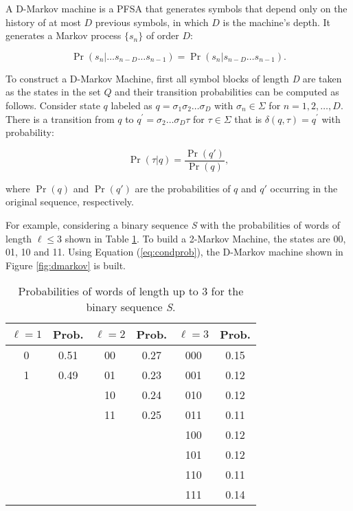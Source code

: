 {A D-Markov machine is a PFSA that generates symbols that depend only on the history of at most $D$ previous symbols, in which $D$ is the machine's depth. It generates a Markov process $\{s_n\}$ of order $D$:

\[
\Pr(s_n|\ldots s_{n-D}\ldots s_{n-1}) = \Pr(s_n|s_{n-D}\ldots s_{n-1}).
\]

\noindent To construct a D-Markov Machine, first all symbol blocks of length \textit{D} are taken as the states in the set $Q$ and their transition probabilities can be computed as follows. Consider state $q$ labeled as $q = \sigma_1\sigma_2\ldots\sigma_{D}$ with $\sigma_n\in\Sigma$ for $n = 1,2,\ldots,D$. There is a transition from $q$ to $q^{\prime} = \sigma_2\ldots\sigma_{D}\tau$ for $\tau\in\Sigma$ that is $\delta(q,\tau) = q^{\prime}$ with probability:

\begin{equation}\label{eq:condprob}
\Pr(\tau | q) = \frac{\Pr(q')}{\Pr(q)},
\end{equation}

\noindent where $\Pr(q)$ and $\Pr(q')$ are the probabilities of $q$ and $q'$ occurring in the original sequence, respectively.

For example, considering a binary sequence \textit{S} with the probabilities of words of length $\ell \leq 3$ shown in Table \ref{tab:subseq}. To build a 2-Markov Machine, the states are 00, 01, 10 and 11.  Using Equation (\ref{eq:condprob}), the D-Markov machine shown in Figure \ref{fig:dmarkov} is built.

\begin{table}
\centering
\caption{Probabilities of words of length up to 3 for the binary sequence \textit{S}. \label{tab:subseq}}
\begin{tabular}{|c|c|c|c|c|c|}
\hline
$\ell = 1$ & Prob. & $\ell = 2$ & Prob. & $\ell = 3$ & Prob. \\
\hline
0 & 0.51 & 00 & 0.27 & 000 & 0.15\\
1 & 0.49 & 01 & 0.23 & 001 & 0.12\\
  &      & 10 & 0.24 & 010 & 0.12\\
  &      & 11 & 0.25 & 011 & 0.11\\
  &	     &    &      & 100 & 0.12\\
  &      &    &      & 101 & 0.12\\
  &      &    &      & 110 & 0.11\\
  &      &    &      & 111 & 0.14\\
\hline
\end{tabular}
\end{table}

}
